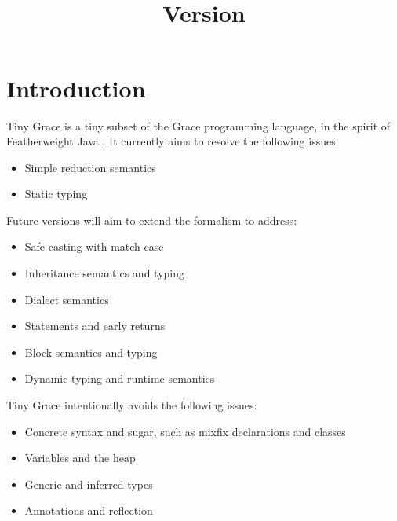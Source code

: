 \documentclass[a4paper, 11pt]{article}
\title{\thetitle\\\normalsize\vspace{0.5em}Version \version\vspace{-0.5em}}
\author{\theauthor}
\begin{document}
\maketitle\vspace{-2em}

\section{Introduction}

Tiny Grace is a tiny subset of the Grace programming language, in the spirit of
Featherweight Java \cite{fj}.  It currently aims to resolve the following
issues:

\begin{itemize}

    \item Simple reduction semantics

    \item Static typing

\end{itemize}

\noindent Future versions will aim to extend the formalism to address:

\begin{itemize}

    \item Safe casting with match-case

    \item Inheritance semantics and typing

    \item Dialect semantics

    \item Statements and early returns

    \item Block semantics and typing

    \item Dynamic typing and runtime semantics

\end{itemize}

\noindent Tiny Grace intentionally avoids the following issues:

\begin{itemize}

    \item Concrete syntax and sugar, such as mixfix declarations and classes

    \item Variables and the heap

    \item Generic and inferred types

    \item Annotations and reflection

\end{itemize}
\end{document}
